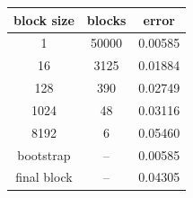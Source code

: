 \begin{center}
\label{tab:1e-statistics}
\setlength{\tabcolsep}{4pt}
\begin{tabular}{@{}ccc@{}}
\toprule
block size & blocks & error \\
\midrule
1 & 50000 & 0.00585 \\
16 & 3125 & 0.01884 \\
128 & 390 & 0.02749 \\
1024 & 48 & 0.03116 \\
8192 & 6 & 0.05460 \\
\midrule
bootstrap & -- & 0.00585 \\
final block & -- & 0.04305 \\
\bottomrule
\end{tabular}
\end{center}
